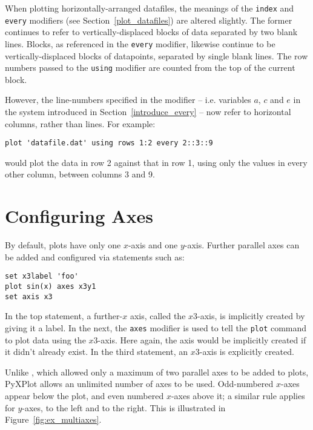 When plotting horizontally-arranged datafiles, the meanings of the
{\tt index} and {\tt every} modifiers (see Section~\ref{plot_datafiles})
are altered slightly. The former continues to refer to vertically-displaced
blocks of data separated by two blank lines.  Blocks, as referenced in the
{\tt every} modifier, likewise continue to be vertically-displaced blocks of
datapoints, separated by single blank lines. The row numbers passed to the
{\tt using} modifier are counted from the top of the current block.

However, the line-numbers specified in the  modifier -- i.e.
variables $a$, $c$ and $e$ in the system introduced in
Section~\ref{introduce_every} -- now refer to horizontal columns, rather than
lines. For example:

\begin{verbatim}
plot 'datafile.dat' using rows 1:2 every 2::3::9
\end{verbatim}

\noindent would plot the data in row 2 against that in row 1, using only the
values in every other column, between columns 3 and 9.

\section{Configuring Axes}
\label{axis_extensions}\label{ranges_multiaxes}\label{multiple_axes}

By default, plots have only one $x$-axis and one $y$-axis. Further parallel
axes can be added and configured via statements such as:

\begin{verbatim}
set x3label 'foo'
plot sin(x) axes x3y1
set axis x3
\end{verbatim}

\noindent In the top statement, a further-$x$ axis, called the $x3$-axis, is
implicitly created by giving it a label. In the next, the {\tt axes}
modifier is used to tell the {\tt plot} command to plot data using the
$x3$-axis. Here again, the axis would be implicitly created if it didn't
already exist.  In the third statement, an $x3$-axis is explicitly created.

Unlike \gnuplot, which allowed only a maximum of two parallel axes to be added
to plots, PyXPlot allows an unlimited number of axes to be used. Odd-numbered
$x$-axes appear below the plot, and even numbered $x$-axes above it; a similar
rule applies for $y$-axes, to the left and to the right. This is illustrated in
Figure~\ref{fig:ex_multiaxes}.

